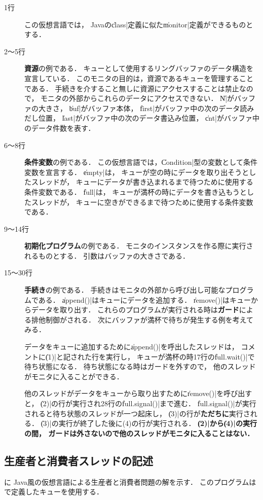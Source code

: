 \begin{description}
\item [1行] この仮想言語では，
Javaの\|class|定義に似た\|monitor|定義ができるものとする．

\item [2〜5行] {\bf 資源}の例である．
キューとして使用するリングバッファのデータ構造を宣言している．
このモニタの目的は，資源であるキューを管理することである．
手続きを介すること無しに資源にアクセスすることは禁止なので，
モニタの外部からこれらのデータにアクセスできない．
\|N|がバッファの大きさ，
\|buf|がバッファ本体，
\|first|がバッファ中の次のデータ読みだし位置，
\|last|がバッファ中の次のデータ書込み位置，
\|cnt|がバッファ中のデータ件数を表す．

\item [6〜8行] {\bf 条件変数}の例である．
この仮想言語では，\|Condition|型の変数として条件変数を宣言する．
\|empty|は，
キューが空の時にデータを取り出そうとしたスレッドが，
キューにデータが書き込まれるまで待つために使用する条件変数である．
\|full|は，
キューが満杯の時にデータを書き込もうとしたスレッドが，
キューに空きができるまで待つために使用する条件変数である．

\item [9〜14行] {\bf 初期化プログラム}の例である．
モニタのインスタンスを作る際に実行されるものとする．
引数はバッファの大きさである．

\item [15〜30行] {\bf 手続き}の例である．
手続きはモニタの外部から呼び出し可能なプログラムである．
\|append()|はキューにデータを追加する．
\|remove()|はキューからデータを取り出す．
これらのプログラムが実行される時は{\bf ガード}による排他制御がされる．
次にバッファが満杯で待ちが発生する例を考えてみる．

データをキューに追加するために\|append()|を呼出したスレッドは，
コメントに\|(1)|と記された行を実行し，
キューが満杯の時17行の\|full.wait()|で待ち状態になる．
待ち状態になる時はガードを外すので，
他のスレッドがモニタに入ることができる．

他のスレッドがデータをキューから取り出すために\|remove()|を呼び出すと，
\|(2)|の行が実行され28行の\|full.signal()|まで進む．
\|full.signal()|が実行されると待ち状態のスレッドが一つ起床し，
\|(3)|の行が{\bf ただちに}実行される．
\|(3)|の実行が終了した後に(4)の行が実行される．
{\bf \|(2)|から\|(4)|の実行の間，
ガードは外さないので他のスレッドがモニタに入ることはない．}

\end{description}

\subsection{生産者と消費者スレッドの記述}
に
Java風の仮想言語による生産者と消費者問題の解を示す．
このプログラムはで定義したキューを使用する．

